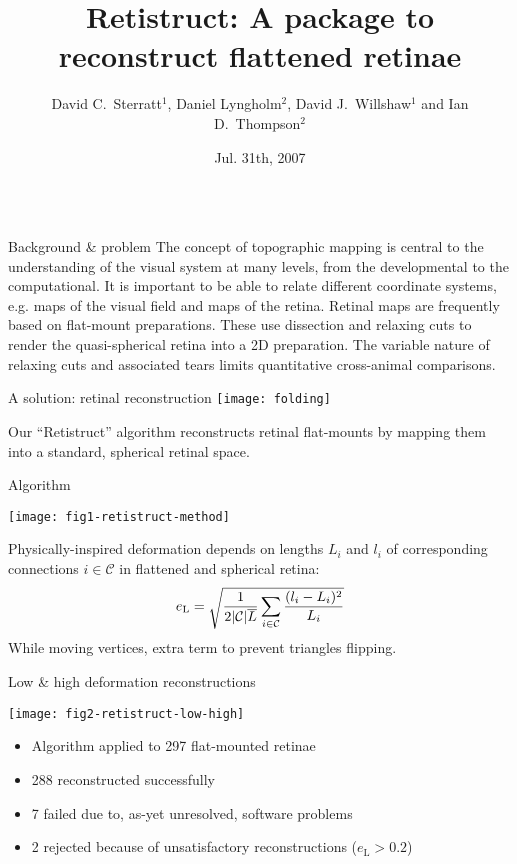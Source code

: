 \documentclass[final]{beamer}
\title{Retistruct: A package to reconstruct flattened retinae}
\author{David C.\ Sterratt$^1$, Daniel Lyngholm$^2$, David
  J.\ Willshaw$^1$ and Ian D.\ Thompson$^2$}
\institute{$^1$Institute for Adaptive \& Neural Computation, School of
  Informatics, University of Edinburgh\\ $^2$MRC Centre for
  Developmental Neurobiology, King's College London}
\date{Jul. 31th, 2007}
\begin{document}
\begin{frame}{} 
  \begin{columns}[T]

    \begin{column}{.37\linewidth}

      \begin{block}{Background \& problem}
        The concept of topographic mapping is central to the
        understanding of the visual system at many levels, from the
        developmental to the computational. It is important to be able
        to relate different coordinate systems, e.g. maps of the
        visual field and maps of the retina. Retinal maps are
        frequently based on flat-mount preparations.  These use
        dissection and relaxing cuts to render the quasi-spherical
        retina into a 2D preparation. The variable nature of relaxing
        cuts and associated tears limits quantitative cross-animal
        comparisons.

      \end{block}

      \begin{block}{A solution: retinal reconstruction}
        \texttt{[image: folding]}     

        Our ``Retistruct'' algorithm reconstructs retinal flat-mounts
        by mapping them into a standard, spherical retinal space.

      \end{block}

      \begin{block}{Algorithm}

        \texttt{[image: fig1-retistruct-method]}

        Physically-inspired deformation depends on lengths $L_i$ and
        $l_i$ of corresponding connections $i\in\mathcal{C}$ in
        flattened and spherical retina:
        \begin{displaymath}
          e_{\text L}=\sqrt{\frac 1{2|\mathcal{C}|\overline L}\sum _{i\in\mathcal{C}}\frac{(l_i-L_i)^2}{L_i}}
        \end{displaymath}
        While moving vertices, extra term to prevent  triangles flipping.
      \end{block}


      \begin{block}{Low \& high deformation reconstructions}

        \texttt{[image: fig2-retistruct-low-high]}     
        \begin{itemize}
        \item  Algorithm applied to 297 flat-mounted retinae
        \item 288  reconstructed successfully
        \item 7 failed due to, as-yet unresolved, software problems
        \item 2 rejected because of unsatisfactory reconstructions ($e_\mathrm{L}>0.2$)
        \end{itemize}
      \end{block}


\end{column}
\end{columns}
\end{frame}
\end{document}
